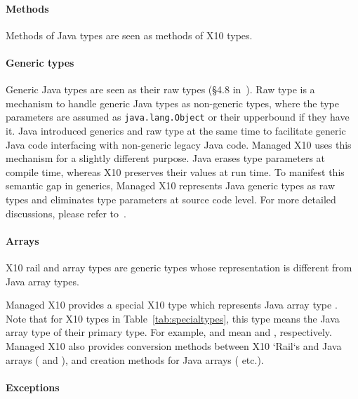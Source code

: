 \paragraph{Methods}

Methods of Java types are seen as methods of X10 types.

\paragraph{Generic types}

Generic Java types are seen as their raw types 
(\S 4.8 in~\cite{java-lang-spec2005}).  Raw type is a mechanism to handle generic
Java types as non-generic types, where the type parameters are assumed
as \verb|java.lang.Object| or their upperbound if they have it.  Java
introduced generics and raw type at the same time to facilitate
generic Java code interfacing with non-generic legacy Java code.
Managed X10 uses this mechanism for a slightly different purpose.
Java erases type parameters at compile time, whereas X10 preserves
their values at run time.  To manifest this semantic gap in generics,
Managed X10 represents Java generic types as raw types and eliminates
type parameters at source code level.  For more detailed discussions,
please refer to~\cite{TakeuchiX1011,TakeuchiX1012}.

\paragraph{Arrays}

X10 rail and array types are generic types whose representation is different
from Java array types.

Managed X10 provides a special X10 type
 which represents Java array type
.  Note that for X10 types in Table~\ref{tab:specialtypes},
this type means the Java array type of their primary type.  For
example,  and  mean
 and , respectively.  Managed X10
also provides conversion methods between X10 \xcd`Rail`s and Java
arrays ( and
),
and creation methods for Java arrays 
(
etc.).

\paragraph{Exceptions}

